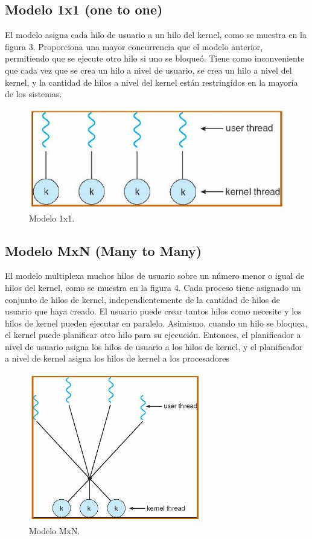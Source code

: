 \documentclass{article}
\begin{document}
\subsection{Modelo 1x1 (one to one)}
El modelo asigna cada hilo de usuario a un hilo del kernel, como se muestra en la figura 3. Proporciona una mayor concurrencia que el modelo anterior, permitiendo que se ejecute otro hilo si uno se bloqueó.  Tiene como inconveniente que cada vez que se crea un hilo a nivel de usuario, se crea un hilo a nivel del kernel, y la cantidad de hilos a nivel del kernel están restringidos en la mayoría de los sistemas. 

\begin{figure}[h!]
\centering
\includegraphics[scale=0.7]{hilos2.JPG}
\caption{Modelo 1x1.\cite{hker}}
\label{fig:hilos2}
\end{figure}

\subsection{Modelo MxN (Many to Many)}
El modelo multiplexa muchos hilos de usuario sobre un número menor o igual de hilos del kernel, como se muestra en la figura 4. Cada proceso tiene asignado un conjunto de hilos de kernel, independientemente de la cantidad de hilos de usuario que haya creado. El usuario puede crear tantos hilos como necesite y los hilos de kernel pueden ejecutar en paralelo. Asimismo, cuando un hilo se bloquea, el kernel puede planificar otro hilo para su ejecución.  Entonces, el planificador  a nivel de usuario asigna los hilos de usuario a los hilos de kernel, y el planificador a nivel de kernel asigna los hilos de kernel a los procesadores

\begin{figure}[h!]
\centering
\includegraphics[scale=0.7]{hilos3.JPG}
\caption{Modelo MxN.\cite{hker}}
\label{fig:hilos3}
\end{figure}
\end{document}
